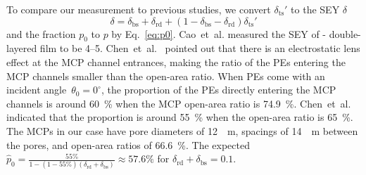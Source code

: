 To compare our measurement to previous studies, we convert \(\delta_\text{ts}'\)
to the SEY \(\delta\)
\begin{equation}
	\label{eq:2}
	\delta = \delta_\text{bs} + \delta_\text{rd} + (1-\delta_\text{bs} - \delta_\text{rd}) \delta_\text{ts}'
\end{equation}
and the fraction \(p_0\) to \(p\) by Eq.~\eqref{eq:p0}.
Cao~et~al.\cite{cao_secondary_2021} measured the SEY of - double-layered film
to be 4--5. Chen~et~al.~\cite{2016Optimization} pointed out
that there is an electrostatic lens effect at the MCP channel entrances,
making the ratio of the PEs entering the MCP channels
smaller than the open-area ratio.
When PEs come with an incident angle~$\theta_0=0^\circ$,
the proportion of the PEs directly entering the MCP channels is around \SI{60}{\percent} when the MCP open-area ratio is \SI{74.9}{\percent}.
Chen~et~al.~\cite{chen2018photoelectron} indicated that
the proportion is around \SI{55}{\percent} when the open-area ratio is \SI{65}{\percent}.
The MCPs in our case have pore diameters of \SI{12}{\mu\meter}, spacings of \SI{14}{\mu\meter} between the pores,
and open-area ratios of \SI{66.6}{\percent}.
The expected $\hat{p}_0 = \frac{55\%}{1-(1-55\%)(\delta_{\mathrm{rd}}+\delta_{\mathrm{bs}})}\approx 57.6\%$ for $\delta_{\mathrm{rd}}+\delta_{\mathrm{bs}}=0.1$.
